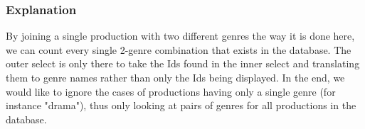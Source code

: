 \subsubsection{Explanation}
By joining a single production with two different genres the way it is done here, we can count every single 2-genre combination that exists in the database. The outer select is only there to take the Ids found in the inner select and translating them to genre names rather than only the Ids being displayed. In the end, we would like to ignore the cases of productions having only a single genre (for instance "drama"), thus only looking at pairs of genres for all productions in the database.